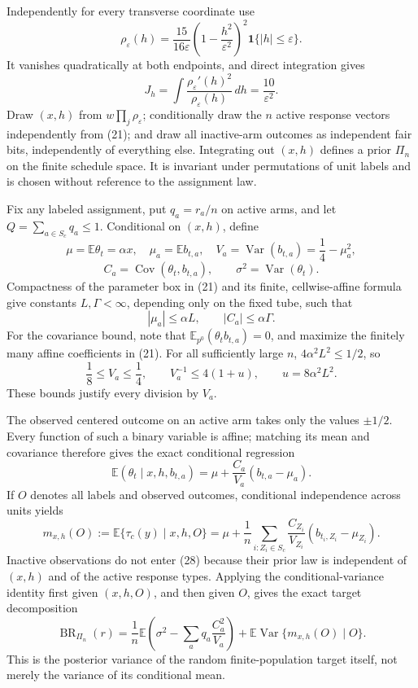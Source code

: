 Independently for every transverse coordinate use
\[
\rho_\varepsilon(h)=\frac{15}{16\varepsilon}
\left(1-\frac{h^2}{\varepsilon^2}\right)^2
\mathbf1\{|h|\le\varepsilon\}.
\]
It vanishes quadratically at both endpoints, and direct integration gives
\[
J_h=\int\frac{\rho_\varepsilon'(h)^2}{\rho_\varepsilon(h)}\,dh
=\frac{10}{\varepsilon^2}.
\tag{25}
\]
Draw \((x,h)\) from \(w\prod_j\rho_\varepsilon\); conditionally draw the \(n\) active response vectors independently from (21); and draw all inactive-arm outcomes as independent fair bits, independently of everything else.  Integrating out \((x,h)\) defines a prior \(\Pi_n\) on the finite schedule space.  It is invariant under permutations of unit labels and is chosen without reference to the assignment law.

Fix any labeled assignment, put \(q_a=r_a/n\) on active arms, and let \(Q=\sum_{a\in S_c}q_a\le1\).  Conditional on \((x,h)\), define
\[
\mu=\mathbb E\theta_t=\alpha x,\quad
\mu_a=\mathbb Eb_{t,a},\quad
V_a=\operatorname{Var}(b_{t,a})=\frac14-\mu_a^2,
\]
\[
C_a=\operatorname{Cov}(\theta_t,b_{t,a}),
\qquad
\sigma^2=\operatorname{Var}(\theta_t).
\]
Compactness of the parameter box in (21) and its finite, cellwise-affine formula give constants \(L,\Gamma<\infty\), depending only on the fixed tube, such that
\[
|\mu_a|\le\alpha L,
\qquad
|C_a|\le\alpha\Gamma.
\tag{26}
\]
For the covariance bound, note that \(\mathbb E_{p^0}(\theta_tb_{t,a})=0\), and maximize the finitely many affine coefficients in (21).  For all sufficiently large \(n\), \(4\alpha^2L^2\le1/2\), so
\[
\frac18\le V_a\le\frac14,
\qquad
V_a^{-1}\le4(1+u),
\qquad
u=8\alpha^2L^2.
\tag{27}
\]
These bounds justify every division by \(V_a\).

The observed centered outcome on an active arm takes only the values \(\pm1/2\).  Every function of such a binary variable is affine; matching its mean and covariance therefore gives the exact conditional regression
\[
\mathbb E(\theta_t\mid x,h,b_{t,a})
=\mu+\frac{C_a}{V_a}(b_{t,a}-\mu_a).
\]
If \(O\) denotes all labels and observed outcomes, conditional independence across units yields
\[
m_{x,h}(O):=\mathbb E\{\tau_c(y)\mid x,h,O\}
=\mu+\frac1n\sum_{i:Z_i\in S_c}
\frac{C_{Z_i}}{V_{Z_i}}(b_{t_i,Z_i}-\mu_{Z_i}).
\tag{28}
\]
Inactive observations do not enter (28) because their prior law is independent of \((x,h)\) and of the active response types.  Applying the conditional-variance identity first given \((x,h,O)\), and then given \(O\), gives the exact target decomposition
\[
\operatorname{BR}_{\Pi_n}(r)
=\frac1n\mathbb E\left(\sigma^2-\sum_aq_a\frac{C_a^2}{V_a}\right)
+\mathbb E\operatorname{Var}\{m_{x,h}(O)\mid O\}.
\tag{29}
\]
This is the posterior variance of the random finite-population target itself, not merely the variance of its conditional mean.

